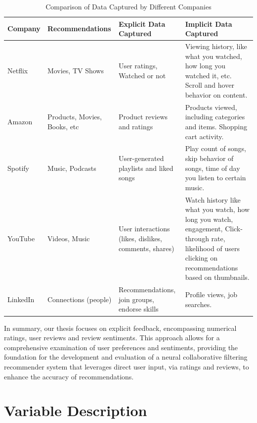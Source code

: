 \begin{table}[h]
  \centering
  \begin{tabular}{|p{3cm}|p{3.5cm}|p{3.5cm}|p{5cm}|}
  \hline
  \textbf{Company} & \textbf{Recommendations} & \textbf{Explicit Data Captured} & \textbf{Implicit Data Captured} \\
  \hline
  Netflix & Movies, TV Shows & User ratings, Watched or not & Viewing history, like what you watched, how long you watched it, etc. Scroll and hover behavior on content. \\
  \hline
  Amazon & Products, Movies, Books, etc & Product reviews and ratings & Products viewed, including categories and items. Shopping cart activity. \\
  \hline
  Spotify & Music, Podcasts & User-generated playlists and liked songs & Play count of songs, skip behavior of songs, time of day you listen to certain music. \\
  \hline
  YouTube & Videos, Music & User interactions (likes, dislikes, comments, shares) & Watch history like what you watch, how long you watch, engagement, Click-through rate, likelihood of users clicking on recommendations based on thumbnails. \\
  \hline
  LinkedIn & Connections (people) & Recommendations, join groups, endorse skills & Profile views, job searches. \\
  \hline
  \end{tabular}
  \caption{Comparison of Data Captured by Different Companies}
  \label{tab:explicit_and_implicit_feedback}
  \end{table}
  
  In summary, our thesis focuses on explicit feedback, encompassing numerical ratings, user reviews and review sentiments. This approach allows for a comprehensive examination of user preferences and sentiments, providing the foundation for the development and evaluation of a neural collaborative filtering recommender system that leverages direct user input, via ratings and reviews, to enhance the accuracy of recommendations.




\section{Variable Description}
\label{sec:3 Variable Description}

